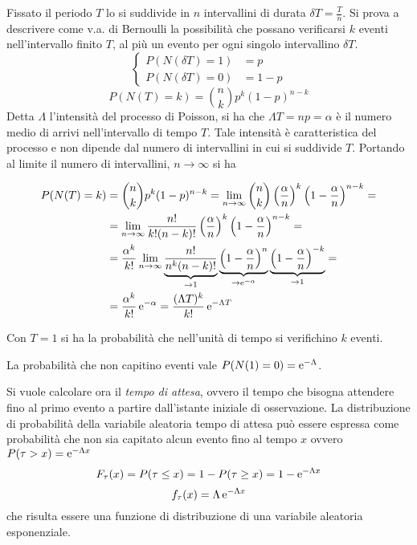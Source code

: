 Fissato il periodo $T$ lo si suddivide in $n$ intervallini di durata $\delta T=\frac{T}{n}$. Si prova a descrivere come v.a. di Bernoulli la possibilità che possano verificarsi $k$ eventi nell'intervallo finito $T$, al più un evento per ogni singolo intervallino $\delta T$.
\begin{equation}
\begin{cases}
P(N(\delta T)=1)&=p\\P(N(\delta T)=0)&=1-p\end{cases}\end{equation}
\begin{equation}P(N(T)=k)=\binom{n}{k}p^k(1-p)^{n-k}
\end{equation}
Detta $\Lambda$ l'intensità del processo di Poisson, si ha che $\Lambda T=n p=\alpha$ è il numero medio di arrivi nell'intervallo di tempo $T$. Tale intensità è caratteristica del processo e non dipende dal numero di intervallini in cui si suddivide $T$. Portando al limite il numero di intervallini, $n\to\infty$ si ha


\[\begin{split}P(N(T)=k)&=\binom{n}{k}p^k(1-p)^{n-k}=\lim\limits_{n\to\infty}\binom{n}{k}\left(\frac{\alpha}{n}\right)^k\left(1-\frac{\alpha}{n}\right)^{n-k}=\\
&=\lim\limits_{n\to\infty}\frac{n!}{k!(n-k)!}\left(\frac{\alpha}{n}\right)^k\left(1-\frac{\alpha}{n}\right)^{n-k}=\\
&=\frac{\alpha^k}{k!}\lim\limits_{n\to\infty}\underbrace{\frac{n!}{n^k(n-k)!}}_{\to 1}\underbrace{\left(1-\frac{\alpha}{n}\right)^n}_{\to\operatorname{e}^{-\alpha}} \underbrace{\left(1-\frac{\alpha}{n}\right)^{-k}}_{\to 1}=\\
&=\frac{\alpha^k}{k!}\operatorname{e}^{-\alpha}=\frac{(\Lambda T)^k}{k!}\operatorname{e}^{-\Lambda T}
\end{split}\]

Con $T=1$ si ha la probabilità che nell'unità di tempo si verifichino $k$ eventi.

La probabilità che non capitino eventi vale $P(N(1)=0)=\operatorname{e}^{-\Lambda}$.

Si vuole calcolare ora il \emph{tempo di attesa}, ovvero il tempo che bisogna attendere fino al primo evento a partire dall'istante iniziale di osservazione. La distribuzione di probabilità della variabile aleatoria tempo di attesa può essere espressa come probabilità che non sia capitato alcun evento fino al tempo $x$ ovvero $P(\tau>x)=\operatorname{e}^{-\Lambda x}$
\begin{equation}
F_\tau(x)=P(\tau\leq x)=1-P(\tau\geq x)=1-\operatorname{e}^{-\Lambda x}
\end{equation}
\begin{equation}
f_\tau(x)=\Lambda\operatorname{e}^{-\Lambda x}
\end{equation}
che risulta essere una funzione di distribuzione di una variabile aleatoria esponenziale.

